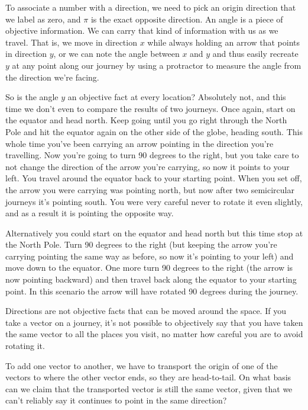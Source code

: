 To associate a number with a direction, we need to pick an origin direction that we label as zero, and $\pi$ is the exact opposite direction. An angle is a piece of objective information. We can carry that kind of information with us as we travel. That is, we move in direction $x$ while always holding an arrow that points in direction $y$, or we can note the angle between $x$ and $y$ and thus easily recreate $y$ at any point along our journey by using a protractor to measure the angle from the direction we're facing.

So is the angle $y$ an objective fact at every location? Absolutely not, and this time we don't even to compare the results of two journeys. Once again, start on the equator and head north. Keep going until you go right through the North Pole and hit the equator again on the other side of the globe, heading south. This whole time you've been carrying an arrow pointing in the direction you're travelling. Now you're going to turn 90 degrees to the right, but you take care to not change the direction of the arrow you're carrying, so now it points to your left. You travel around the equator back to your starting point. When you set off, the arrow you were carrying was pointing north, but now after two semicircular journeys it's pointing south. You were very careful never to rotate it even slightly, and as a result it is pointing the opposite way.

Alternatively you could start on the equator and head north but this time stop at the North Pole. Turn 90 degrees to the right (but keeping the arrow you're carrying pointing the same way as before, so now it's pointing to your left) and move down to the equator. One more turn 90 degrees to the right (the arrow is now pointing backward) and then travel back along the equator to your starting point. In this scenario the arrow will have rotated 90 degrees during the journey.

Directions are not objective facts that can be moved around the space. If you take a vector on a journey, it's not possible to objectively say that you have taken the same vector to all the places you visit, no matter how careful you are to avoid rotating it.

To add one vector to another, we have to transport the origin of one of the vectors to where the other vector ends, so they are head-to-tail. On what basis can we claim that the transported vector is still the same vector, given that we can't reliably say it continues to point in the same direction?

